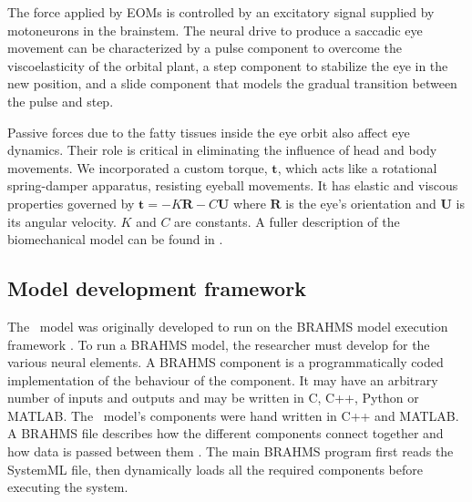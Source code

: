 \documentclass{frontiersSCNS}
\begin{document}
The force applied by EOMs is controlled by an excitatory signal
supplied by motoneurons in the brainstem. The neural drive to produce
a saccadic eye movement can be characterized by a pulse component to
overcome the viscoelasticity of the orbital plant, a step component to
stabilize the eye in the new position, and a slide component that
models the gradual transition between the pulse and step.

Passive forces due to the fatty tissues inside the eye orbit also
affect eye dynamics. Their role is critical in eliminating the
influence of head and body movements. We incorporated a custom torque,
$\mathbf{t}$, which acts like a rotational spring-damper apparatus,
resisting eyeball movements. It has elastic and viscous properties
governed by $\mathbf{t} = -K\mathbf{R}-C\mathbf{U}$ where $\mathbf{R}$
is the eye's orientation and $\mathbf{U}$ is its angular velocity. $K$
and $C$ are constants. A fuller description of the biomechanical model
can be found in \cite{papapavlou_physics-based_2014}.

\subsection{Model development framework} \label{sec:methods:framework}

The \ccg~model was originally developed to run on the BRAHMS model
execution framework
\citep{mitchinson_brahms:_2010,mitchinson_brahms_2015}. To run a
BRAHMS model, the researcher must develop  for
the various neural elements. A BRAHMS component is a programmatically
coded implementation of the behaviour of the component. It may have an
arbitrary number of inputs and outputs and may be written in C, C++,
Python or MATLAB. The \ccg~model's components were hand written in C++
and MATLAB. A BRAHMS  file describes how the different
components connect together and how data is passed between them
\citep{mitchinson_brahms:_2010}. The main BRAHMS program first
reads the SystemML file, then dynamically loads all the required
components before executing the system.
\end{document}
